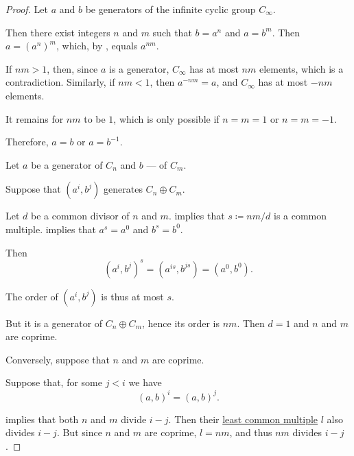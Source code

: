 \begin{proof}
   Let \( a \) and \( b \) be generators of the infinite cyclic group \( C_\infty \).

  Then there exist integers \( n \) and \( m \) such that \( b = a^n \) and \( a = b^m \). Then \( a = (a^n)^m \), which, by , equals \( a^{nm} \).

  If \( nm > 1 \), then, since \( a \) is a generator, \( C_\infty \) has at most \( nm \) elements, which is a contradiction. Similarly, if \( nm < 1 \), then \( a^{-nm} = a \), and \( C_\infty \) has at most \( -nm \) elements.

  It remains for \( nm \) to be \( 1 \), which is only possible if \( n = m = 1 \) or \( n = m = -1 \).

  Therefore, \( a = b \) or \( a = b^{-1} \).

   Let \( a \) be a generator of \( C_n \) and \( b \) --- of \( C_m \).

  \SufficiencySubProof* Suppose that \( (a^i, b^j) \) generates \( C_n \oplus C_m \).

  Let \( d \) be a common divisor of \( n \) and \( m \).  implies that \( s \coloneqq nm / d \) is a common multiple.  implies that \( a^s = a^0 \) and \( b^s = b^0 \).

  Then
  \begin{equation*}
    (a^i, b^j)^s = (a^{is}, b^{js}) = (a^0, b^0).
  \end{equation*}

  The order of \( (a^i, b^j) \) is thus at most \( s \).

  But it is a generator of \( C_n \oplus C_m \), hence its order is \( nm \). Then \( d = 1 \) and \( n \) and \( m \) are coprime.

  \NecessitySubProof* Conversely, suppose that \( n \) and \( m \) are coprime.

  Suppose that, for some \( j < i \) we have
  \begin{equation*}
    (a, b)^i = (a, b)^j.
  \end{equation*}

   implies that both \( n \) and \( m \) divide \( i - j \). Then their \hyperref[def:lcm]{least common multiple} \( l \) also divides \( i - j \). But since \( n \) and \( m \) are coprime, \( l = nm \), and thus \( nm \) divides \( i - j \).


\end{proof}
